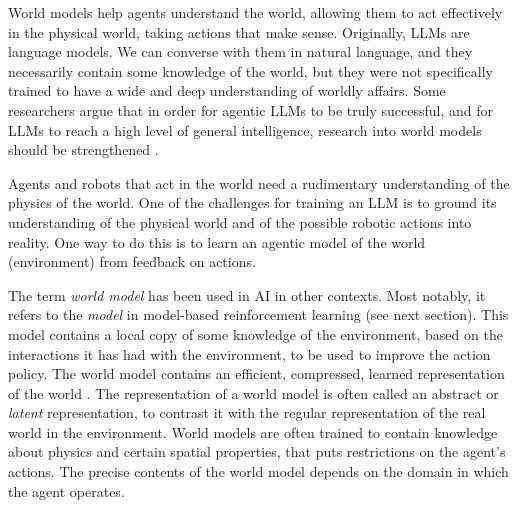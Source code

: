 World models help agents understand the world, allowing them to act effectively in the physical world, taking actions that make sense. Originally, LLMs are language models. We can converse with them in natural language, and they necessarily contain some knowledge of the world, but they were not specifically trained to have a wide and deep understanding of worldly affairs. Some researchers argue that in order for agentic LLMs to be truly successful, and for LLMs to reach a high level of general intelligence, research into world models should be strengthened \citep{sutton2022alberta,matsuo2022deep,lecun2022path,klindt2026does}.




Agents and robots that act in the world need a rudimentary understanding of the physics of the world.
One of the challenges for training an LLM is to ground its understanding of the physical world and of the possible robotic actions into reality.
One way to do this is to learn an agentic model of the world (environment) from feedback on actions.

The term {\em world model} has been used in AI in other contexts. Most notably, it refers to the {\em model} in model-based reinforcement learning \citep{ha2018world,moerland2023model,sutton1991dyna} (see next section). %
This model contains a local copy of some knowledge of the environment, based on the interactions it has had with the environment, to be used to improve the action policy. 
The world model contains an efficient, compressed, learned representation of the world \citep{hafner2018learning,plaat2020deep}. The representation of a world model is often called an abstract or  {\em latent} representation, to contrast it with the regular representation of the real world in the environment. 
World models are often trained to contain knowledge about  physics and certain spatial properties, that puts restrictions on the agent's actions. %
The precise contents of the world model depends on the domain in which the agent operates. 




